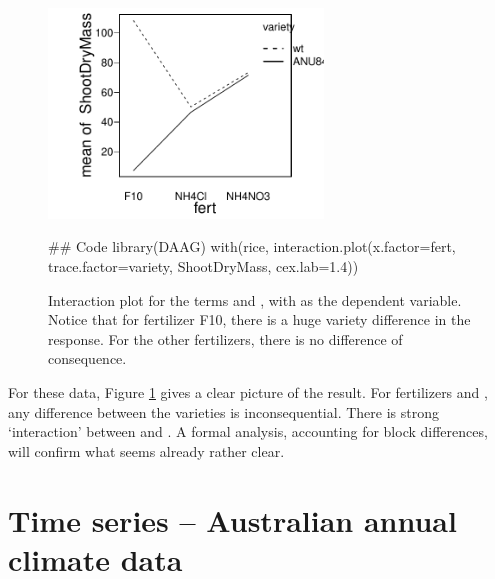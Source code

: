 \begin{figure}
\begin{Schunk}


\centerline{\includegraphics[width=0.65\textwidth]{figs/03-do-interact-1} }

\end{Schunk}
    \caption{Interaction plot for the terms  and
      , with  as the dependent
      variable. Notice that for fertilizer F10, there is a huge
      variety difference in the response. For the other fertilizers,
      there is no difference of consequence.\label{fig:rice-interact}}
\begin{Schunk}
\begin{Sinput}
## Code
library(DAAG)
with(rice, interaction.plot(x.factor=fert,
                            trace.factor=variety,
                            ShootDryMass,
                            cex.lab=1.4))
\end{Sinput}
\end{Schunk}
\end{figure}

For these data, 
Figure \ref{fig:rice-interact} gives a clear picture
of the result. For fertilizers  and , any
difference between the varieties is inconsequential.   There is
strong `interaction' between  and .  A
formal analysis, accounting for block differences, will confirm what
seems already rather clear. 

\section{Time series -- Australian annual climate data}

